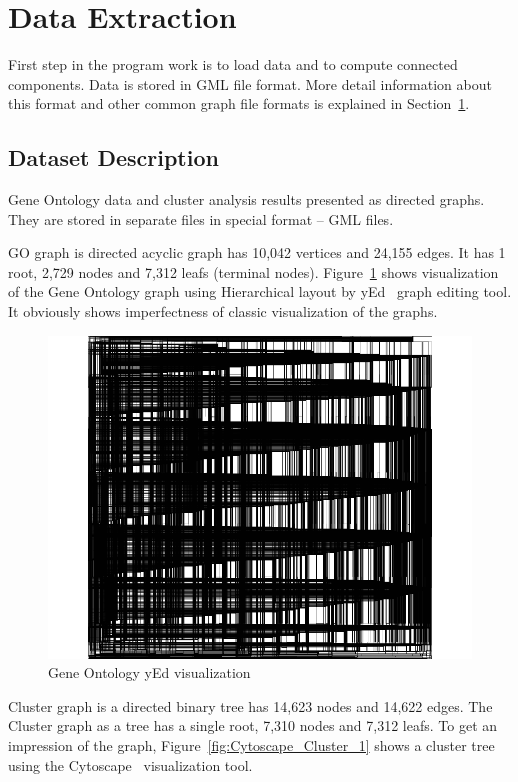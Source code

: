 \section{Data Extraction}
\label{sec:algorithm}
First step in the program work is to load data and to compute connected components. Data is stored in GML file format. More detail information about this format and other common graph file formats is explained in Section~\ref{sec:algorithm}.

\subsection{Dataset Description}
\label{sec:dataset_description}
Gene Ontology data and cluster analysis results presented as directed graphs. They are stored in separate files in special format -- GML files.


GO graph is directed acyclic graph has 10,042 vertices and  24,155 edges. It has 1 root, 2,729 nodes and 7,312 leafs (terminal nodes). Figure~\ref{fig:yed_GO_vis} shows visualization of the Gene Ontology graph using Hierarchical layout by yEd~\cite{yed} graph editing tool. It obviously shows imperfectness of classic visualization of the graphs.


\begin{figure}[h!]
\centering
\includegraphics[scale=0.3]{pictures/yEd_GO.png}
\caption{Gene Ontology yEd visualization}
\label{fig:yed_GO_vis}
\end{figure}


Cluster graph is a directed binary tree has 14,623 nodes and 14,622 edges. The Cluster graph as a tree has a single root, 7,310 nodes and 7,312 leafs. To get an impression of the graph, Figure~\ref{fig:Cytoscape_Cluster_1} shows a cluster tree using the Cytoscape~\cite{Cytoscape} visualization tool.

